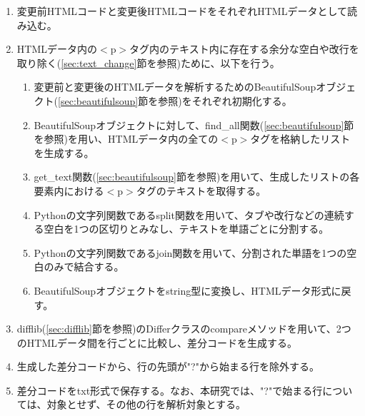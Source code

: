 \begin{enumerate}
    \item 変更前HTMLコードと変更後HTMLコードをそれぞれHTMLデータとして読み込む。
    \item HTMLデータ内の$<$p$>$タグ内のテキスト内に存在する余分な空白や改行を取り除く(\ref{sec:text_change}節を参照)ために、以下を行う。
          \begin{enumerate}
              \item 変更前と変更後のHTMLデータを解析するためのBeautifulSoupオブジェクト(\ref{sec:beautifulsoup}節を参照)をそれぞれ初期化する。
              \item BeautifulSoupオブジェクトに対して、find\_all関数(\ref{sec:beautifulsoup}節を参照)を用い、HTMLデータ内の全ての$<$p$>$タグを格納したリストを生成する。
              \item get\_text関数(\ref{sec:beautifulsoup}節を参照)を用いて、生成したリストの各要素内における$<$p$>$タグのテキストを取得する。
              \item Pythonの文字列関数であるsplit関数を用いて、タブや改行などの連続する空白を1つの区切りとみなし、テキストを単語ごとに分割する。
              \item Pythonの文字列関数であるjoin関数を用いて、分割された単語を1つの空白のみで結合する。
              \item BeautifulSoupオブジェクトをstring型に変換し、HTMLデータ形式に戻す。
          \end{enumerate}
    \item difflib(\ref{sec:difflib}節を参照)のDifferクラスのcompareメソッドを用いて、2つのHTMLデータ間を行ごとに比較し、差分コードを生成する。
    \item 生成した差分コードから、行の先頭が"?"から始まる行を除外する。
    \item 差分コードをtxt形式で保存する。なお、本研究では、"?"で始まる行については、対象とせず、その他の行を解析対象とする。
\end{enumerate}


